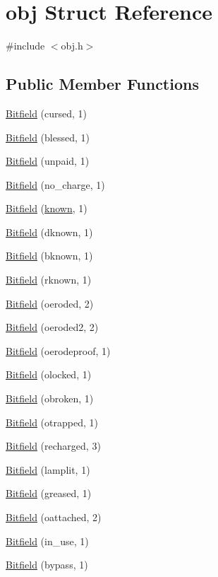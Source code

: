 \hypertarget{structobj}{\section{obj Struct Reference}
\label{structobj}
}


{\ttfamily \#include $<$obj.\+h$>$}

\subsection*{Public Member Functions}
\begin{DoxyCompactItemize}
\item 
\hyperlink{structobj_ae098fd8c7fe6569b7fcba3277ef8479d}{Bitfield} (cursed, 1)
\item 
\hyperlink{structobj_ad987efd3c654d1e5fd5ca18c22f8cb23}{Bitfield} (blessed, 1)
\item 
\hyperlink{structobj_a8e3c9046c545115b5468b0334528fda1}{Bitfield} (unpaid, 1)
\item 
\hyperlink{structobj_a71b5fee55c1b937611fce3e6330719e1}{Bitfield} (no\+\_\+charge, 1)
\item 
\hyperlink{structobj_a021be6e81eb85b07e1c795ae67c6eacb}{Bitfield} (\hyperlink{detect_8c_a2373e3a270d2b530119452501548080a}{known}, 1)
\item 
\hyperlink{structobj_adb5cbc380aa5c49dfdd1ee511204465b}{Bitfield} (dknown, 1)
\item 
\hyperlink{structobj_a0919c7dc30d65b420b4e2010b52f03d4}{Bitfield} (bknown, 1)
\item 
\hyperlink{structobj_ae8e593bb6c56977d017df5d732a92179}{Bitfield} (rknown, 1)
\item 
\hyperlink{structobj_abf795f6e486d657bcc4c7d026e00eae8}{Bitfield} (oeroded, 2)
\item 
\hyperlink{structobj_a078ad1a5ffdd353c9e5c8c0ecd9fd895}{Bitfield} (oeroded2, 2)
\item 
\hyperlink{structobj_a035f3350c6aa2d1296a088d3f41bca11}{Bitfield} (oerodeproof, 1)
\item 
\hyperlink{structobj_a831e0c84c4b9cb581a44088472cb0969}{Bitfield} (olocked, 1)
\item 
\hyperlink{structobj_a6e669e91871b525d622a3caf415187c5}{Bitfield} (obroken, 1)
\item 
\hyperlink{structobj_a18688be7f6535d75a5e2649d37e099ad}{Bitfield} (otrapped, 1)
\item 
\hyperlink{structobj_aebb34f11fae865b4f5a8b1d6664158b4}{Bitfield} (recharged, 3)
\item 
\hyperlink{structobj_a23d299be0df158148eef796aaa0bcb4f}{Bitfield} (lamplit, 1)
\item 
\hyperlink{structobj_abf579c99de830d74afda41c4a54902ec}{Bitfield} (greased, 1)
\item 
\hyperlink{structobj_aedbcbdafdff28a8eac366864354c8141}{Bitfield} (oattached, 2)
\item 
\hyperlink{structobj_a43d51f6df8b35d7fa648c5ba3e3eff68}{Bitfield} (in\+\_\+use, 1)
\item 
\hyperlink{structobj_a98f2d165cc713d6749938f079878e8d2}{Bitfield} (bypass, 1)
\end{DoxyCompactItemize}
